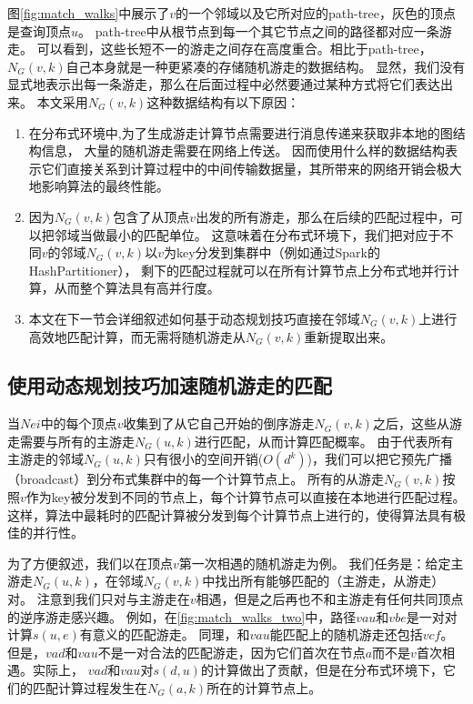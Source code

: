 \documentclass[master]{njuthesis}
\begin{document}
图\ref{fig:match_walks}中展示了$v$的一个邻域以及它所对应的path-tree，灰色的顶点是查询顶点$u$。
path-tree中从根节点到每一个其它节点之间的路径都对应一条游走。
可以看到，这些长短不一的游走之间存在高度重合。相比于path-tree，$N_{G}(v, k)$自己本身就是一种更紧凑的存储随机游走的数据结构。
显然，我们没有显式地表示出每一条游走，那么在后面过程中必然要通过某种方式将它们表达出来。
本文采用$N_{G}(v, k)$这种数据结构有以下原因：
\begin{enumerate}
 \item 在分布式环境中,为了生成游走计算节点需要进行消息传递来获取非本地的图结构信息，
大量的随机游走需要在网络上传送。
因而使用什么样的数据结构表示它们直接关系到计算过程中的中间传输数据量，其所带来的网络开销会极大地影响算法的最终性能。
\item 因为$N_{G}(v, k)$包含了从顶点$v$出发的所有游走，那么在后续的匹配过程中，可以把邻域当做最小的匹配单位。
这意味着在分布式环境下，我们把对应于不同$v$的邻域$N_{G}(v, k)$以$v$为key分发到集群中（例如通过Spark的HashPartitioner），
剩下的匹配过程就可以在所有计算节点上分布式地并行计算，从而整个算法具有高并行度。
\item 本文在下一节会详细叙述如何基于动态规划技巧直接在邻域$N_{G}(v, k)$上进行高效地匹配计算，而无需将随机游走从$N_{G}(v, k)$重新提取出来。
\end{enumerate}

\subsection{使用动态规划技巧加速随机游走的匹配}
当$Nei$中的每个顶点$v$收集到了从它自己开始的倒序游走$N_{G}(v, k)$之后，这些从游走需要与所有的主游走$N_{G}(u, k)$进行匹配，从而计算匹配概率。
由于代表所有主游走的邻域$N_{G}(u, k)$只有很小的空间开销($O(d^k)$)，我们可以把它预先广播（broadcast）到分布式集群中的每一个计算节点上。
所有的从游走$N_{G}(v, k)$按照$v$作为key被分发到不同的节点上，每个计算节点可以直接在本地进行匹配过程。
这样，算法中最耗时的匹配计算被分发到每个计算节点上进行的，使得算法具有极佳的并行性。

为了方便叙述，我们以在顶点$v$第一次相遇的随机游走为例。
我们任务是：给定主游走$N_{G}(u,k)$，在邻域$N_{G}(v, k)$中找出所有能够匹配的（主游走，从游走）对。
注意到我们只对与主游走在$v$相遇，但是之后再也不和主游走有任何共同顶点的逆序游走感兴趣。
例如，在\ref{fig:match_walks_two}中，路径$vau$和$vbe$是一对对计算$s(u,e)$有意义的匹配游走。
同理，和$vau$能匹配上的随机游走还包括$vcf$。
但是，$vad$和$vau$不是一对合法的匹配游走，因为它们首次在节点$a$而不是$v$首次相遇。实际上，
$vad$和$vau$对$s(d,u)$的计算做出了贡献，但是在分布式环境下，它们的匹配计算过程发生在$N_{G}(a, k)$所在的计算节点上。
\end{document}
